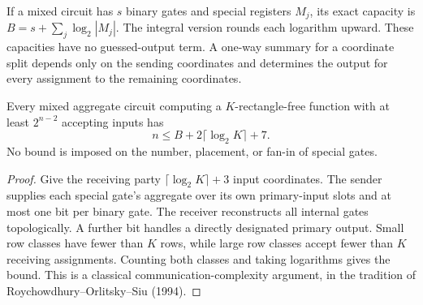 \begin{definition}
  \label{def:lowerbounds-algebraic-aggregate-capacity}
  \leanok
  If a mixed circuit has $s$ binary gates and special registers $M_j$, its exact
  capacity is $B=s+\sum_j\log_2|M_j|$. The integral version rounds each logarithm
  upward. These capacities have no guessed-output term. A one-way summary for a
  coordinate split depends only on the sending coordinates and determines the
  output for every assignment to the remaining coordinates.
\end{definition}

\begin{theorem}
  \label{thm:lowerbounds-algebraic-aggregate-capacity-finite}
  \leanok
  Every mixed aggregate circuit computing a $K$-rectangle-free function with at
  least $2^{n-2}$ accepting inputs has
  \[
    n\le B+2\lceil\log_2 K\rceil+7.
  \]
  No bound is imposed on the number, placement, or fan-in of special gates.
\end{theorem}
\begin{proof}
  \leanok
  Give the receiving party $\lceil\log_2K\rceil+3$ input coordinates. The sender
  supplies each special gate's aggregate over its own primary-input slots and at
  most one bit per binary gate. The receiver reconstructs all internal gates
  topologically. A further bit handles a directly designated primary output.
  Small row classes have fewer than $K$ rows, while large row classes accept fewer
  than $K$ receiving assignments. Counting both classes and taking logarithms gives
  the bound. This is a classical communication-complexity argument, in the tradition
  of Roychowdhury--Orlitsky--Siu (1994).
\end{proof}

